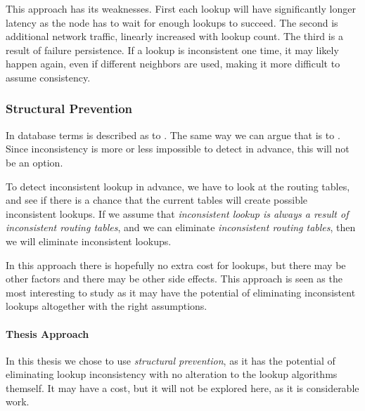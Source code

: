 This approach has its weaknesses. First each lookup will have significantly longer latency
 as the node has to wait for enough lookups to succeed. The second is additional
 network traffic, linearly increased with lookup count.
 The third is a result of failure persistence. If a lookup is inconsistent
 one time, it may likely happen again, even if different neighbors are used,
 making it more difficult to assume consistency.

\subsubsection{Structural Prevention}
\label{problem:AvoidingInconsistency}

In database terms  is described as to  \cite{oszu-99-podds}. The same way we can argue that  is to . Since inconsistency is more or less
 impossible to detect in advance, this will not be an option.

To detect inconsistent lookup in advance, we have to look at the routing tables, and
 see if there is a chance that the current tables will create possible inconsistent
 lookups. If we assume that \emph{inconsistent lookup is always a result of inconsistent
 routing tables}, and we can eliminate \emph{inconsistent routing tables},
 then we will eliminate inconsistent lookups.

In this approach there is hopefully no extra cost for lookups, but there may
 be other factors and there may be other side effects. This approach is seen
 as the most interesting to study as it may have the potential of eliminating
 inconsistent lookups altogether with the right assumptions.

\paragraph{Thesis Approach}
In this thesis we chose to use \emph{structural prevention}, as it has the
 potential of eliminating lookup inconsistency with no alteration to the
 lookup algorithms themself. It may have a cost, but it will not be explored
 here, as it is considerable work.

